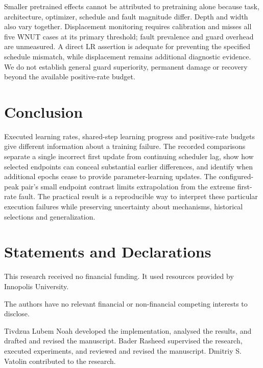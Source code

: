 \documentclass[referee,pdflatex,sn-mathphys-num]{sn-jnl}
\begin{document}
Smaller pretrained effects cannot be attributed to pretraining alone because task, architecture, optimizer, schedule and fault magnitude differ. Depth and width also vary together. Displacement monitoring requires calibration and misses all five WNUT cases at its primary threshold; fault prevalence and guard overhead are unmeasured. A direct LR assertion is adequate for preventing the specified schedule mismatch, while displacement remains additional diagnostic evidence. We do not establish general guard superiority, permanent damage or recovery beyond the available positive-rate budget.

\section{Conclusion}\label{conclusion}

Executed learning rates, shared-step learning progress and positive-rate budgets give different information about a training failure. The recorded comparisons separate a single incorrect first update from continuing scheduler lag, show how selected endpoints can conceal substantial earlier differences, and identify when additional epochs cease to provide parameter-learning updates. The configured-peak pair's small endpoint contrast limits extrapolation from the extreme first-rate fault. The practical result is a reproducible way to interpret these particular execution failures while preserving uncertainty about mechanisms, historical selections and generalization.

\backmatter
\section*{Statements and Declarations}\label{statements-and-declarations}

\label{funding}

This research received no financial funding. It used resources provided by Innopolis University.

\label{competing-interests}

The authors have no relevant financial or non-financial competing interests to disclose.

\label{author-contributions}

Tivdzua Lubem Noah developed the implementation, analysed the results, and drafted and revised the manuscript. Bader Rasheed supervised the research, executed experiments, and reviewed and revised the manuscript. Dmitriy S. Vatolin contributed to the research.
\end{document}

